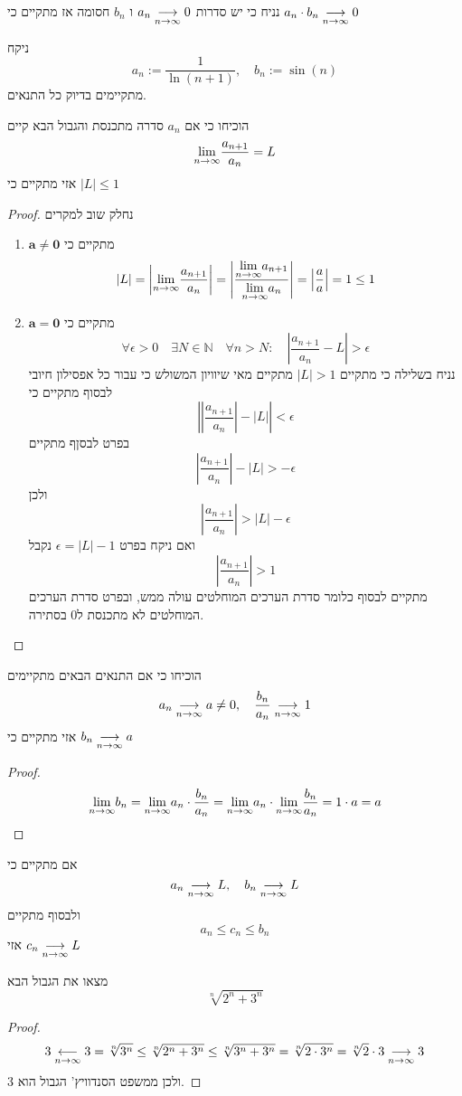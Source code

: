 \documentclass{article}
\begin{document}
\begin{theorem}
נניח כי יש סדרות 
$a_n\underset{n\rightarrow\infty}{\longrightarrow} 0$
ו 
$b_n$
חסומה אז מתקיים כי 
$a_n\cdot b_n\underset{n\rightarrow\infty}{\longrightarrow} 0$
\end{theorem}
\begin{example}
ניקח 
\[a_n := \frac{1}{\ln (n+1)}, \quad b_n:=\sin(n) \]
מתקיימים בדיוק כל התנאים.
\end{example}
\begin{exercise}
הוכיחו כי אם 
$a_n$
סדרה מתכנסת והגבול הבא קיים 
\[\underset{n\rightarrow\infty}{\lim} \frac{a_{n+1}}{a_n} = L\]
אזי מתקיים כי 
$|L|\leq 1$
\end{exercise}
\begin{proof}
נחלק שוב למקרים 
\begin{enumerate}
\item $\mathbf{a\neq 0}$
מתקיים כי 
\[|L| = \left|\underset{n\rightarrow\infty}{\lim} \frac{a_{n+1}}{a_n}\right| = \left|\frac{\underset{n\rightarrow\infty}{\lim} a_{n+1}}{\underset{n\rightarrow\infty}{\lim} a_n}\right| = \left|\frac{a}{a}\right| = 1\leq 1\]
\item $\mathbf{a=0}$
מתקיים כי 
\[\forall\epsilon>0\quad \exists N\in\mathbb{N} \quad \forall n > N: \quad \left|\frac{a_{n+1}}{a_n} - L\right|>\epsilon\]
נניח בשלילה כי מתקיים 
$|L|>1$
מתקיים מאי שיוויון המשולש כי עבור כל אפסילון חיובי לבסוף מתקיים כי 
\[\left|\left|\frac{a_{n+1}}{a_n}\right|-|L|\right|<\epsilon\]
בפרט לבסןף מתקיים
\[\left|\frac{a_{n+1}}{a_n}\right|-|L|>-\epsilon\]
ולכן
\[\left|\frac{a_{n+1}}{a_n}\right|>|L|-\epsilon\]
ואם ניקח בפרט 
$\epsilon = |L|-1$
נקבל 
\[\left|\frac{a_{n+1}}{a_n}\right|>1\]
 מתקיים לבסוף כלומר סדרת הערכים המוחלטים עולה ממש, ובפרט סדרת הערכים המוחלטים לא מתכנסת ל0 בסתירה. 
\end{enumerate}
\end{proof}

\begin{exercise}
הוכיחו כי אם התנאים הבאים מתקיימים 
\[a_n\underset{n\rightarrow\infty}{\longrightarrow} a\neq0,\quad \frac{b_n}{a_n}\underset{n\rightarrow\infty}{\longrightarrow} 1\]
אזי מתקיים כי 
$b_n\underset{n\rightarrow\infty}{\longrightarrow} a$
\end{exercise}
\begin{proof}
\[\underset{n\rightarrow\infty}{\lim} b_n = \underset{n\rightarrow\infty}{\lim} a_n\cdot \frac{b_n}{a_n} = \underset{n\rightarrow\infty}{\lim} a_n \cdot \underset{n\rightarrow\infty}{\lim} \frac{b_n}{a_n} = 1\cdot a =a\]
\end{proof}

\begin{theorem}
אם מתקיים כי 
\[a_n\underset{n\rightarrow\infty}{\longrightarrow} L,\quad b_n\underset{n\rightarrow\infty}{\longrightarrow} L\]
ולבסוף מתקיים 
\[a_n\leq c_n\leq b_n\]
אזי 
$c_n\underset{n\rightarrow\infty}{\longrightarrow} L$
\end{theorem}

\begin{example}
מצאו את הגבול הבא 
\[\sqrt[n]{2^n+3^n}\]
\end{example}
\begin{proof}
\[3\underset{n\rightarrow\infty}{\longleftarrow} 3 = \sqrt[n]{3^n}\leq \sqrt[n]{2^n+3^n}\leq \sqrt[n]{3^n+3^n} = \sqrt[n]{2\cdot 3^n} = \sqrt[n]{2}\cdot 3\underset{n\rightarrow\infty}{\longrightarrow} 3\]
ולכן ממשפט הסנדוויץ' הגבול הוא 3.
\end{proof}
\end{document}
